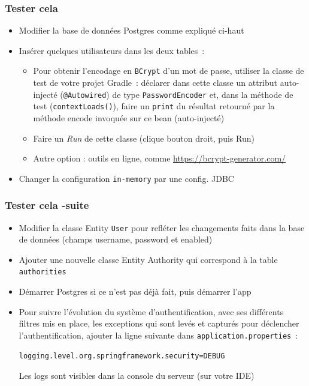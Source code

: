 \documentclass{beamer}
\begin{document}
\begin{frame}[fragile]
	\frametitle{Tester cela}
	\begin{itemize}
		\item Modifier la base de données Postgres comme expliqué ci-haut
		\item Insérer quelques utilisateurs dans les deux tables~:
		\begin{itemize}
			\item Pour obtenir l'encodage en \texttt{BCrypt} d'un mot de passe, utiliser la classe de test de votre projet Gradle~: déclarer dans cette classe un attribut auto-injecté (\texttt{@Autowired}) de type \texttt{PasswordEncoder} et, dans la méthode de test (\texttt{contextLoads()}), faire un \texttt{print} du résultat retourné par la méthode encode invoquée sur ce bean (auto-injecté)
			\item Faire un \textit{Run} de cette classe (clique bouton droit, puis Run)
			\item Autre option : outils en ligne, comme \url{https://bcrypt-generator.com/}
		\end{itemize}
		\item Changer la configuration \texttt{in-memory} par une config. JDBC
	\end{itemize}
\end{frame}

\begin{frame}[fragile]
\frametitle{Tester cela -suite}
\begin{itemize}		
		\item Modifier la classe Entity \texttt{User} pour refléter les changements faits dans la base de données (champs username, password et enabled)
		\item Ajouter une nouvelle classe Entity Authority qui correspond à la table \texttt{authorities}
		\item Démarrer Postgres si ce n'est pas déjà fait, puis démarrer l'app
		\item Pour suivre l'évolution du système d'authentification, avec ses différents filtres mis en place, les exceptions qui sont levés et capturés pour déclencher l'authentification, ajouter la ligne suivante dans \texttt{application.properties}~:\\
\begin{lstlisting}
logging.level.org.springframework.security=DEBUG
\end{lstlisting}
Les logs sont visibles dans la console du serveur (sur votre IDE)
	\end{itemize}
\end{frame}
\end{document}
